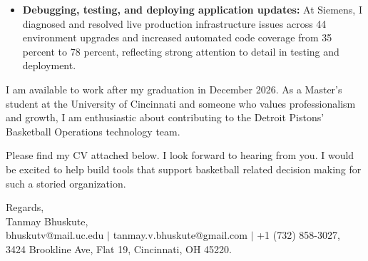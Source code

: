 \documentclass[11pt]{letter}
\begin{document}
\begin{letter}{}
\begin{itemize}[leftmargin=*, itemsep=0.45em]
    \item \textbf{Debugging, testing, and deploying application updates:} At Siemens, I diagnosed and resolved live production infrastructure issues across 44 environment upgrades and increased automated code coverage from 35 percent to 78 percent, reflecting strong attention to detail in testing and deployment.
\end{itemize}

I am available to work after my graduation in December 2026. As a Master's student at the University of Cincinnati and someone who values professionalism and growth, I am enthusiastic about contributing to the Detroit Pistons' Basketball Operations technology team.

Please find my CV attached below. I look forward to hearing from you. I would be excited to help build tools that support basketball related decision making for such a storied organization.

{\setlength{\parskip}{0pt}
Regards,\\
Tanmay Bhuskute,\\
bhuskutv@mail.uc.edu $\mid$ tanmay.v.bhuskute@gmail.com $\mid$ +1 (732) 858-3027,\\
3424 Brookline Ave, Flat 19, Cincinnati, OH 45220.
}

\end{letter}
\end{document}
